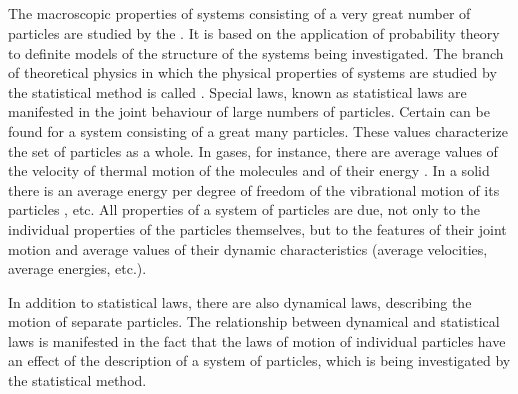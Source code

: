 \subsection{}\label{8.2.2} The macroscopic properties of systems consisting of a very great number of particles are studied by the . It is based on the application of probability theory to definite models of the structure of the systems being investigated. The branch of theoretical physics in which the physical prop­erties of systems are studied by the statistical method is called . Special laws, known as statistical laws are manifested in the joint behaviour of large numbers of particles. Certain  can be found for a system consisting of a great many particles. These values characterize the set of particles as a whole. In gases, for instance, there are average values of the velocity of thermal motion of the molecules  and of their energy . In a solid there is an average energy per degree of freedom of the vibrational motion of its particles , etc. All properties of a system of particles are due, not only to the individual properties of the particles themselves, but to the features of their joint motion and average values of their dynamic characteristics (average velocities, average energies, etc.).

In addition to statistical laws, there are also dynamical laws, describing the motion of separate particles. The relationship between dynamical and statistical laws is manifested in the fact that the laws of motion of individual particles have an effect of the description of a system of particles, which is being investigated by the statistical method.

